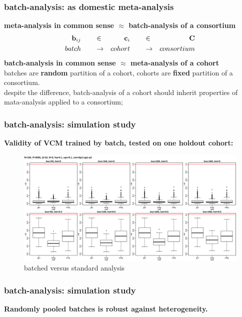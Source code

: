 \documentclass{beamer}
\begin{document}
\begin{frame}\frametitle{batch-analysis: as domestic meta-analysis}
  \textbf{meta-analysis in common sense $\approx$ batch-analysis of a
    consortium}
  \begin{align*}
    \mathbf{b}_{ij} & \qquad \in & \mathbf{c}_i  & \qquad \in & \mathbf{C} \\
    batch    & \qquad \to & cohort & \qquad \to & consortium
  \end{align*}
  \textbf{batch-analysis in common sense $\approx$ meta-analysis of a cohort} \\
  batches are {\color{red}\textbf{random}} partition of a cohort,
  cohorts are {\color{red}\textbf{fixed}} partition of a consortium. \\
  despite the difference, batch-analysis of a cohort should inherit
  properties of mata-analysis applied to a consortium;
\end{frame}
\begin{frame} \frametitle{batch-analysis: simulation study} %
  \textbf{Validity of VCM trained by batch, tested on one holdout
    cohort:}
  \begin{figure}[h]
    \centering \includegraphics[width=1.0\textwidth]{img/bat_vcm_mse}
    \caption{batched versus standard analysis}
    \label{fig:bat}
  \end{figure}
\end{frame}
\begin{frame} \frametitle{batch-analysis: simulation study}
  \large
  \textbf{Randomly pooled batches is robust against heterogeneity.}
  \normalsize
\end{frame}
\end{document}
